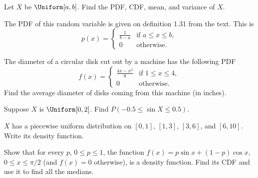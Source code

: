 \begin{problem}[Handout 12, \# 2]
  Let \(X\) be \(\Uniform[a,b]\). Find the PDF, CDF, mean, and variance of
  \(X\).
\end{problem}
\begin{solution}
  The PDF of this random variable is given on definition 1.31 from the
  text. This is
  \[
    p(x)=
    \begin{cases}
      \displaystyle\frac{1}{b-a}&\text{if \(a\leq x\leq b\),}\\
      0&\text{otherwise.}
    \end{cases}
  \]
\end{solution}
\newpage

\begin{problem}[Handout 12, \# 8]
  The diameter of a circular disk cut out by a machine has the following
  PDF
  \[
    f(x)=\begin{cases}
      \displaystyle\frac{4x-x^2}{9}&\text{if \(1\leq x\leq 4\),}\\
      0&\text{otherwise.}
    \end{cases}
  \]
  Find the average diameter of disks coming from this machine (in inches).
\end{problem}
\begin{solution}

\end{solution}
\newpage

\begin{problem}[Handout 12, \# 9]
  Suppose \(X\) is \(\Uniform[0,2]\). Find \(P(-0.5\leq \sin X\leq 0.5)\).
\end{problem}
\begin{solution}

\end{solution}
\newpage

\begin{problem}[Handout 12, \# 13]
  \(X\) has a piecewise uniform distribution on \([0,1]\), \([1,3]\),
  \([3,6]\), and \([6,10]\). Write its density function.
\end{problem}
\begin{solution}

\end{solution}
\newpage

\begin{problem}[Handout 12, \# 16]
  Show that for every \(p\), \(0\leq p\leq 1\), the function \(f(x)=p\sin
  x+(1-p)\cos x\), \(0\leq x\leq\pi/2\) (and \(f(x)=0\) otherwise), is a
  density function. Find its CDF and use it to find all the medians.
\end{problem}
\begin{solution}

\end{solution}
\newpage

